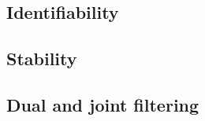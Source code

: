 \subsection{Identifiability}
\parencite{Haykin2001,Cappe2005}
\subsection{Stability}
\parencite{Haykin2001}
\subsection{Dual and joint filtering}
\parencite{Haykin2001}